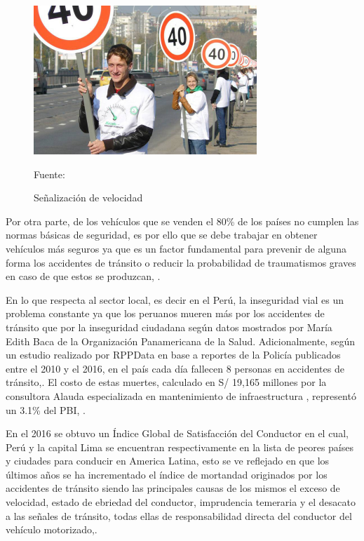 	\vskip 0.15cm
	\begin{figure}[H]
	\begin{center}
	\includegraphics[width=0.75\textwidth]{images/intro/velocidad}
	\end{center}
	\begin{center}
	\caption{\small{Señalización de velocidad}}
	{\small{Fuente: \citep{OMS}}}
	\end{center}
	\vspace{-1.5em}
	\end{figure}
	
	Por otra parte, de los vehículos que se venden el 80\% de los países no cumplen las normas básicas de seguridad, es por ello que se debe trabajar en obtener vehículos más seguros ya que es un factor fundamental para prevenir de alguna forma los accidentes de tránsito o reducir la probabilidad de traumatismos graves en caso de que estos se produzcan, \citep{OMS}.
	
	\vskip 0.15cm
	En lo que respecta al sector local, es decir en el Perú, la inseguridad vial es un problema constante ya que los peruanos mueren más por los accidentes de tránsito que por la inseguridad ciudadana según datos mostrados por María Edith Baca de la Organización Panamericana de la Salud\citep{OPS}. Adicionalmente, según un estudio realizado por RPPData en base a reportes de la Policía publicados entre el 2010 y el 2016, en el país cada día fallecen 8 personas en accidentes de tránsito,\citep{RPPData}. El costo de estas muertes, calculado en S/ 19,165 millones por la consultora Alauda especializada en mantenimiento de infraestructura , representó un 3.1\% del PBI, \citep{Gestion2}.  
	
	
	\vskip 0.15cm
	En el 2016 se obtuvo un Índice Global de Satisfacción del Conductor \citep{CNN} en el cual, Perú y la capital Lima se encuentran respectivamente en la lista de peores países y ciudades para conducir en America Latina, esto se ve reflejado en que los últimos años se ha incrementado el índice de mortandad originados por los accidentes de tránsito siendo las principales causas de los mismos el exceso de velocidad, estado de ebriedad del conductor, imprudencia temeraria y el desacato a las señales de tránsito, todas ellas de responsabilidad directa del conductor del vehículo motorizado,\citep{SUTRAN}. 
	
